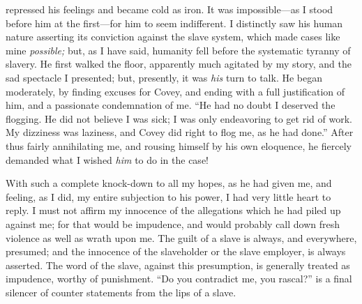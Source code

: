 repressed his feelings and became cold as iron. It was impossible---as I
stood before him at the first---for him to seem indifferent. I
distinctly saw his human nature asserting its conviction against the
slave system, which made cases like mine \emph{possible;} but, as I have
said, humanity fell before the systematic tyranny of slavery. He first
walked the floor, apparently much agitated by my story, and the sad
spectacle I presented; but, presently, it was \emph{his} turn to talk.
He began moderately, by finding excuses for Covey, and ending with a
full justification of him, and a passionate condemnation of me. ``He had
no doubt I deserved the flogging. He did not believe I was sick; I was
only endeavoring to get rid of work. My dizziness was laziness, and
Covey did right to flog me, as he had done.'' After thus fairly
annihilating me, and rousing himself by his own eloquence,
{\protect\hypertarget{230}{}{}}he fiercely demanded what I wished
\emph{him} to do in the case!

With such a complete knock-down to all my hopes, as he had given me, and
feeling, as I did, my entire subjection to his power, I had very little
heart to reply. I must not affirm my innocence of the allegations which
he had piled up against me; for that would be impudence, and would
probably call down fresh violence as well as wrath upon me. The guilt of
a slave is always, and everywhere, presumed; and the innocence of the
slaveholder or the slave employer, is always asserted. The word of the
slave, against this presumption, is generally treated as impudence,
worthy of punishment. ``Do you contradict me, you rascal?'' is a final
silencer of counter statements from the lips of a slave.

